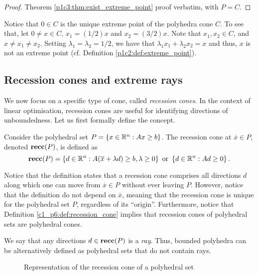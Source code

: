 \begin{proof}
	Theorem \ref{p1c3:thm:exist_extreme_point} proof verbatim, with $P = C$.	
\end{proof}

Notice that $0 \in C$ is the unique extreme point of the polyhedra cone $C$. To see that, let $0 \neq x \in C$, $x_1 = (1/2) x$ and $x_2 = (3/2)x$. Note that $x_1, x_2 \in C$, and $x \neq x_1 \neq x_2$. Setting $\lambda_1 = \lambda_2 = 1/2$, we have that $\lambda_1x_1  + \lambda_2x_2 = x$ and thus, $x$ is not an extreme point (cf. Definition \ref{p1c2:def:extreme_point}). 


\subsection{Recession cones and extreme rays}

We now focus on a specific type of cone, called \emph{recession cones}. In the context of linear optimisation, recession cones are useful for identifying directions of unboundedness. Let us first formally define the concept.

\begin{definition} \label{c1_p6:def:recession_cone}
	Consider the polyhedral set $P = \left\{ x \in \mathbb{R}^n : Ax \geq b \right \}$. The recession cone at $\overline{x} \in P$, denoted ${\bf recc}(P)$, is defined as
	\begin{equation*}
		{\bf recc}(P) = \left\{ d \in \mathbb{R}^n : A(\overline{x} + \lambda d) \geq b, \lambda \geq 0 \right \} \text{ or } \left\{ d \in \mathbb{R}^n : Ad \geq 0 \right \}. 	
	\end{equation*}
\end{definition}

Notice that the definition states that a recession cone comprises all directions $d$ along which one can move from $\overline{x} \in P$ without ever leaving $P$. However, notice that the definition do not depend on $\overline{x}$, meaning that the recession cone is unique for the polyhedral set $P$, regardless of its ``origin''. Furthermore, notice that Definition \ref{c1_p6:def:recession_cone} implies that recession cones of polyhedral sets are polyhedral cones. 

We say that any directions $d \in {\bf recc}(P)$ is a \emph{ray}. Thus, bounded polyhedra can be alternatively defined as polyhedral sets that do not contain rays. 

\begin{figure}[h]
	\caption{Representation of the recession cone of a polyhedral set} \label{p1c6:fig:recession_cone}	
\end{figure}

